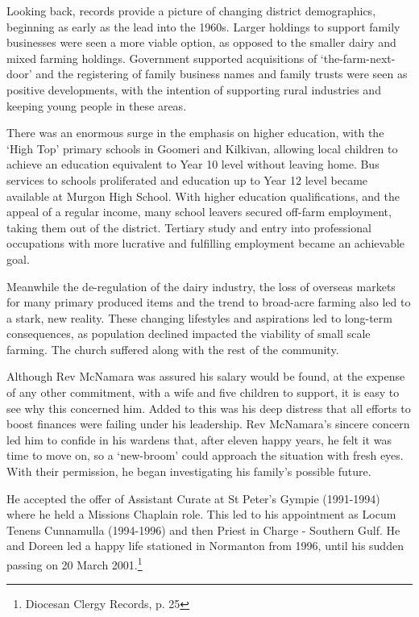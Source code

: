 Looking back, records provide a picture of changing district demographics, beginning as early as the lead into the 1960s. Larger holdings to support family businesses were seen a more viable option, as opposed to the smaller dairy and mixed farming holdings. Government supported acquisitions of `the-farm-next-door' and the registering of family business names and family trusts were seen as positive developments, with the intention of supporting rural industries and keeping young people in these areas.

There was an enormous surge in the emphasis on higher education, with the `High Top' primary schools in Goomeri and Kilkivan, allowing local children to achieve an education equivalent to Year 10 level without leaving home. Bus services to schools proliferated and education up to Year 12 level became available at Murgon High School. With higher education qualifications, and the appeal of a regular income, many school leavers secured off-farm employment, taking them out of the district. Tertiary study and entry into professional occupations with more lucrative and fulfilling employment became an achievable goal.

Meanwhile the de-regulation of the dairy industry, the loss of overseas markets for many primary produced items and the trend to broad-acre farming also led to a stark, new reality. These changing lifestyles and aspirations led to long-term consequences, as population declined impacted the viability of small scale farming. The church suffered along with the rest of the community.

Although Rev McNamara was assured his salary would be found, at the expense of any other commitment, with a wife and five children to support, it is easy to see why this concerned him. Added to this was his deep distress that all efforts to boost finances were failing under his leadership. Rev McNamara's sincere concern led him to confide in his wardens that, after eleven happy years, he felt it was time to move on, so a `new-broom' could approach the situation with fresh eyes. With their permission, he began investigating his family's possible future.

He accepted the offer of Assistant Curate at St Peter's Gympie (1991-1994) where he held a Missions Chaplain role. This led to his appointment as Locum Tenens Cunnamulla (1994-1996) and then Priest in Charge - Southern Gulf. He and Doreen led a happy life stationed in Normanton from 1996, until his sudden passing on 20 March 2001.\footnote{Diocesan Clergy Records, p. 25}

